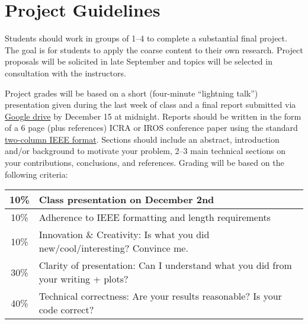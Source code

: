 \documentclass[11pt,letterpaper]{article}
\begin{document}
\section*{Project Guidelines}

Students should work in groups of 1--4 to complete a substantial final project. The goal is for students to apply the coarse content to their own research. Project proposals will be solicited in late September and topics will be selected in consultation with the instructors.

\medskip
\noindent
Project grades will be based on a short (four-minute ``lightning talk'') presentation given during the last week of class and a final report submitted via \href{https://forms.gle/6uj9E8XkzP8mAh6v9}{Google drive} by December 15 at midnight. Reports should be written in the form of a 6 page (plus references) ICRA or IROS conference paper using the standard \href{https://www.ieee.org/conferences/publishing/templates.html}{two-column IEEE format}. Sections should include an abstract, introduction and/or background to motivate your problem, 2--3 main technical sections on your contributions, conclusions, and references. Grading will be based on the following criteria:
\newline
\newline
\begin{tabular}{|c|l|}
\hline
10\% & Class presentation on December 2nd\\
\hline
10\% & Adherence to IEEE formatting and length requirements \\
\hline
10\% & Innovation \& Creativity: Is what you did new/cool/interesting? Convince me. \\
\hline
30\% & Clarity of presentation: Can I understand what you did from your writing + plots? \\
\hline
40\% & Technical correctness: Are your results reasonable? Is your code correct? \\
\hline	
\end{tabular}
\end{document}
